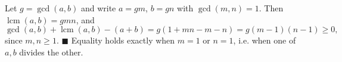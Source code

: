 Let $g=\gcd(a,b)$ and write $a=gm$, $b=gn$ with $\gcd(m,n)=1$. Then $\operatorname{lcm}(a,b)=gmn$, and
\[\gcd(a,b)+\operatorname{lcm}(a,b)-(a+b)=g(1+mn-m-n)=g(m-1)(n-1)\ge0,\]
since $m,n\ge1$. $\blacksquare$ Equality holds exactly when $m=1$ or $n=1$, i.e. when one of $a,b$ divides the other.
